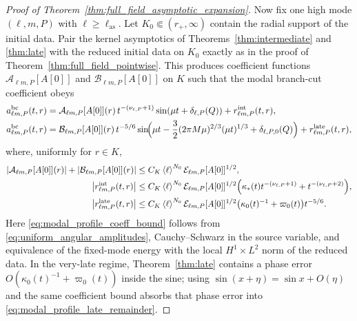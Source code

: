 \documentclass[12pt]{article}
\numberwithin{equation}{section}
\theoremstyle{plain}
\theoremstyle{definition}
\theoremstyle{remark}
\newcommand{\bc}{\mathrm{bc}}
\newcommand{\vp}{\varpi}
\newcommand{\kap}{\kappa}
\newcommand{\angles}[1]{\left\langle #1 \right\rangle}
\newcommand{\abs}[1]{\left|#1\right|}
\begin{document}
\begin{proof}[Proof of Theorem~\ref{thm:full_field_asymptotic_expansion}]
Now fix one high mode $(\ell,m,P)$ with $\ell\ge\ell_{\mathrm{as}}$.  Let $K_0\Subset(r_+,\infty)$ contain the radial support of the initial data.  Pair the kernel asymptotics of Theorems~\ref{thm:intermediate} and \ref{thm:late} with the reduced initial data on $K_0$ exactly as in the proof of Theorem~\ref{thm:full_field_pointwise}.  This produces coefficient functions $\mathcal A_{\ell m,P}[A[0]]$ and $\mathcal B_{\ell m,P}[A[0]]$ on $K$ such that the modal branch-cut coefficient obeys
\begin{align}
   a^{\bc}_{\ell m,P}(t,r)
   &=
   \mathcal A_{\ell m,P}[A[0]](r)
   \,t^{-(\nu_{\ell,P}+1)}
   \sin(\mu t+\delta_{\ell,P}(Q))
   +r^{\mathrm{int}}_{\ell m,P}(t,r),
   \label{eq:modal_intermediate_profile}
   \\
   a^{\bc}_{\ell m,P}(t,r)
   &=
   \mathcal B_{\ell m,P}[A[0]](r)
   \,t^{-5/6}
   \sin\!\Bigl(
      \mu t
      -\frac32(2\pi M\mu)^{2/3}(\mu t)^{1/3}
      +\delta_{\ell,P,0}(Q)
   \Bigr)
   +r^{\mathrm{late}}_{\ell m,P}(t,r),
   \label{eq:modal_late_profile}
\end{align}
where, uniformly for $r\in K$,
\begin{align}
   \abs{\mathcal A_{\ell m,P}[A[0]](r)}
   +
   \abs{\mathcal B_{\ell m,P}[A[0]](r)}
   &\le
   C_K\angles{\ell}^{N_0}\mathcal E_{\ell m,P}[A[0]]^{1/2},
   \label{eq:modal_profile_coeff_bound}
   \\
   \abs{r^{\mathrm{int}}_{\ell m,P}(t,r)}
   &\le
   C_K\angles{\ell}^{N_0}\mathcal E_{\ell m,P}[A[0]]^{1/2}
   \Bigl(
      \kap_*(t)t^{-(\nu_{\ell,P}+1)}
      +
      t^{-(\nu_{\ell,P}+2)}
   \Bigr),
   \label{eq:modal_profile_int_remainder}
   \\
   \abs{r^{\mathrm{late}}_{\ell m,P}(t,r)}
   &\le
   C_K\angles{\ell}^{N_0}\mathcal E_{\ell m,P}[A[0]]^{1/2}
   \bigl(\kap_0(t)^{-1}+\vp_0(t)\bigr)t^{-5/6}.
   \label{eq:modal_profile_late_remainder}
\end{align}
Here \eqref{eq:modal_profile_coeff_bound} follows from \eqref{eq:uniform_angular_amplitudes}, Cauchy--Schwarz in the source variable, and equivalence of the fixed-mode energy with the local $H^1\times L^2$ norm of the reduced data.  In the very-late regime, Theorem~\ref{thm:late} contains a phase error $O(\kap_0(t)^{-1}+\vp_0(t))$ inside the sine; using $\sin(x+\eta)=\sin x+O(\eta)$ and the same coefficient bound absorbs that phase error into \eqref{eq:modal_profile_late_remainder}.


\end{proof}
\end{document}

